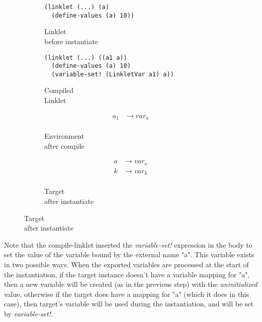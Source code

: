 \begin{figure}[h!]
  \small
  \begin{subfigure}[b]{0.26\textwidth}
    \begin{mdframed}
\begin{verbatim}
(linklet (...) (a)
  (define-values (a) 10))
\end{verbatim}
    \end{mdframed}
    \caption{Linklet \\ before instantiate}
    \label{fig:1}
  \end{subfigure}
  \begin{subfigure}[b]{0.38\textwidth}
    \begin{mdframed}
\begin{verbatim}
(linklet (...) ((a1 a))
  (define-values (a) 10)
  (variable-set! (LinkletVar a1) a))
\end{verbatim}
    \end{mdframed}
    \caption{Compiled \\ Linklet}
    \label{fig:2}
  \end{subfigure} \hfill
  \begin{subfigure}[b]{0.15\textwidth}
    \begin{mdframed}
      \begin{align*}
        a_1 &\rightarrow var_a \\
      \end{align*}
    \end{mdframed}
    \caption{Environment \\ after compile}
    \label{fig:2}
  \end{subfigure}
  \begin{subfigure}[b]{0.15\textwidth}
    \begin{mdframed}
      \begin{align*}
        a &\rightarrow var_a \\
        k &\rightarrow var_k \\
      \end{align*}
    \end{mdframed}
    \caption{Target \\ after instantiate}
    \label{fig:2}
  \end{subfigure}
\end{figure}

Note that the compile-linklet inserted the \emph{variable-set!}
expression in the body to set the value of the variable bound by the
external name "a". This variable exists in two possible ways. When the
exported variables are processed at the start of the instantiation, if
the target instance doesn't have a variable mapping for "a", then a
new variable will be created (as in the previous step) with the
\emph{uninitialized} value, otherwise if the target does have a
mapping for "a" (which it does in this case), then target's variable
will be used during the instantiation, and will be set by
\emph{variable-set!}.

